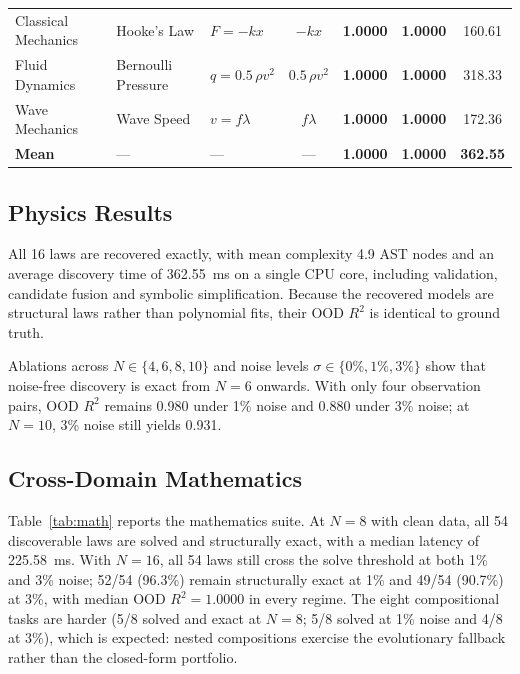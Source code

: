 \documentclass[10pt,journal,compsoc]{IEEEtran}
\begin{document}
\begin{table}[t]
\begin{tabular}{lllcccc}
Classical Mechanics & Hooke's Law & $F = -kx$ & $-kx$ & \textbf{1.0000} & \textbf{1.0000} & 160.61 \\
Fluid Dynamics & Bernoulli Pressure & $q = 0.5\,\rho v^2$ & $0.5\,\rho v^2$ & \textbf{1.0000} & \textbf{1.0000} & 318.33 \\
Wave Mechanics & Wave Speed & $v = f\lambda$ & $f\lambda$ & \textbf{1.0000} & \textbf{1.0000} & 172.36 \\
\midrule
\textbf{Mean} & — & — & — & \textbf{1.0000} & \textbf{1.0000} & \textbf{362.55} \\
\bottomrule
\end{tabular}
\end{table}

\subsection{Physics Results}
All 16 laws are recovered exactly, with mean complexity 4.9 AST nodes and an average discovery time of 362.55~ms on a single CPU core, including validation, candidate fusion and symbolic simplification. Because the recovered models are structural laws rather than polynomial fits, their OOD $R^2$ is identical to ground truth.

Ablations across $N \in \{4,6,8,10\}$ and noise levels $\sigma \in \{0\%,1\%,3\%\}$ show that noise-free discovery is exact from $N=6$ onwards. With only four observation pairs, OOD $R^2$ remains 0.980 under 1\% noise and 0.880 under 3\% noise; at $N=10$, 3\% noise still yields 0.931.

\subsection{Cross-Domain Mathematics}
Table~\ref{tab:math} reports the mathematics suite. At $N=8$ with clean data, all 54 discoverable laws are solved and structurally exact, with a median latency of 225.58~ms. With $N=16$, all 54 laws still cross the solve threshold at both 1\% and 3\% noise; 52/54 (96.3\%) remain structurally exact at 1\% and 49/54 (90.7\%) at 3\%, with median OOD $R^2 = 1.0000$ in every regime. The eight compositional tasks are harder (5/8 solved and exact at $N=8$; 5/8 solved at 1\% noise and 4/8 at 3\%), which is expected: nested compositions exercise the evolutionary fallback rather than the closed-form portfolio.
\end{document}
